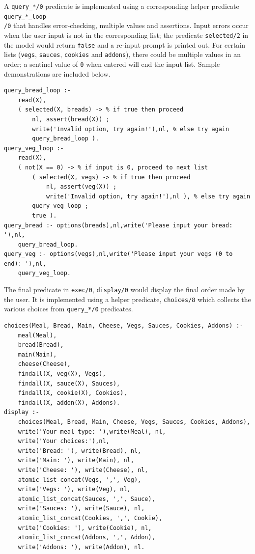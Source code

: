 \documentclass[11pt]{report}
\begin{document}
A \texttt{query\_*/0} predicate is implemented using a corresponding helper
predicate \texttt{query\_*\_loop\\/0} that handles error-checking, multiple
values and assertions.
Input errors occur when the user input is not in the corresponding list; the
predicate \texttt{selected/2} in the model would return \texttt{false} and a
re-input prompt is printed out. For certain lists (\texttt{vegs}, \texttt{sauces},
\texttt{cookies} and \texttt{addons}), there could be multiple values in an order;
a sentinel value of \texttt{0} when entered will end the input list. Sample
demonstrations are included below.

\begin{lstlisting}
query_bread_loop :-
    read(X),
    ( selected(X, breads) -> % if true then proceed
        nl, assert(bread(X)) ;
        write('Invalid option, try again!'),nl, % else try again 
        query_bread_loop ).
query_veg_loop :-
    read(X),
    ( not(X == 0) -> % if input is 0, proceed to next list
        ( selected(X, vegs) -> % if true then proceed
            nl, assert(veg(X)) ;
            write('Invalid option, try again!'),nl ), % else try again         
        query_veg_loop ;
        true ).
query_bread :- options(breads),nl,write('Please input your bread: '),nl,
    query_bread_loop.
query_veg :- options(vegs),nl,write('Please input your vegs (0 to end): '),nl,
    query_veg_loop.
\end{lstlisting}

The final predicate in \texttt{exec/0}, \texttt{display/0} would display the final
order made by the user. It is implemented using a helper predicate,
\texttt{choices/8} which collects the various choices from \texttt{query\_*/0}
predicates.

\begin{lstlisting}
choices(Meal, Bread, Main, Cheese, Vegs, Sauces, Cookies, Addons) :-
    meal(Meal),
    bread(Bread),
    main(Main),
    cheese(Cheese),
    findall(X, veg(X), Vegs),
    findall(X, sauce(X), Sauces),
    findall(X, cookie(X), Cookies),
    findall(X, addon(X), Addons).
display :-
    choices(Meal, Bread, Main, Cheese, Vegs, Sauces, Cookies, Addons),
    write('Your meal type: '),write(Meal), nl,
    write('Your choices:'),nl,
    write('Bread: '), write(Bread), nl,
    write('Main: '), write(Main), nl,
    write('Cheese: '), write(Cheese), nl,
    atomic_list_concat(Vegs, ',', Veg),
    write('Vegs: '), write(Veg), nl,
    atomic_list_concat(Sauces, ',', Sauce),
    write('Sauces: '), write(Sauce), nl,
    atomic_list_concat(Cookies, ',', Cookie),
    write('Cookies: '), write(Cookie), nl,
    atomic_list_concat(Addons, ',', Addon),
    write('Addons: '), write(Addon), nl.
\end{lstlisting}
\end{document}
